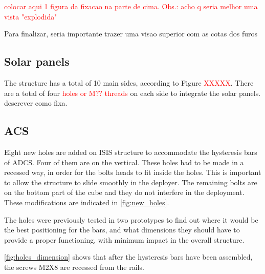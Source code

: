 \textcolor{red}{colocar aqui 1 figura da fixacao na parte de cima. Obs.: acho q seria melhor uma vista "explodida"}

Para finalizar, seria importante trazer uma visao superior com as cotas dos furos

\subsection{Solar panels}

The structure has a total of 10 main sides, according to Figure \textcolor{red}{XXXXX}. There are a total of four \textcolor{red}{holes or M?? threads} on each side to integrate the solar panels. descrever como fixa.

\subsection{ACS}

Eight new holes are added on ISIS structure to accommodate the hysteresis bars of ADCS. Four of them are on the vertical. These holes had to be made in a recessed way, in order for the bolts heads to fit inside the holes. This is important to allow the structure to slide smoothly in the deployer. The remaining bolts are on the bottom part of the cube and they do not interfere in the deployment. These modifications are indicated in \autoref{fig:new_holes}.


The holes were previously tested in two prototypes to find out where it would be the best positioning for the bars, and what dimensions they should have to provide a proper functioning, with minimum impact in the overall structure.

\autoref{fig:holes_dimension} shows that after the hysteresis bars have been assembled, the screws M2X8 are recessed from the rails. 


